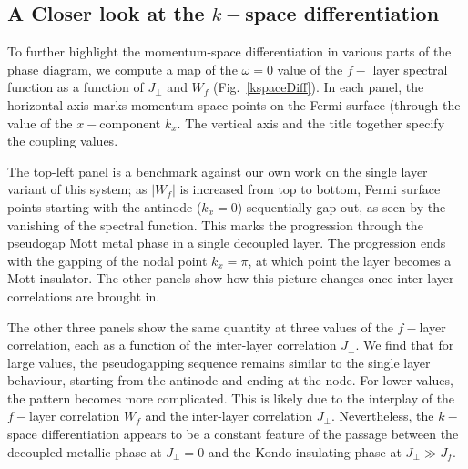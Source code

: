 \documentclass[%
reprint,
superscriptaddress,
groupedaddress,
superscriptaddress,
onecolumn,
10pt
]{revtex4-2}
\begin{document}
\subsection{A Closer look at the \(k-\)space differentiation}
To further highlight the momentum-space differentiation in various parts of the phase diagram, we compute a map of the \(\omega=0\) value of the \(f-\) layer spectral function as a function of \(J_\perp\) and \(W_f\) (Fig.~\ref{kspaceDiff}). In each panel, the horizontal axis marks momentum-space points on the Fermi surface (through the value of the \(x-\)component \(k_x\). The vertical axis and the title together specify the coupling values. 

The top-left panel is a benchmark against our own work on the single layer variant of this system; as \(|W_f|\) is increased from top to bottom, Fermi surface points starting with the antinode (\(k_x=0\)) sequentially gap out, as seen by the vanishing of the spectral function. This marks the progression through the pseudogap Mott metal phase in a single decoupled layer. The progression ends with the gapping of the nodal point \(k_x=\pi\), at which point the layer becomes a Mott insulator. The other panels show how this picture changes once inter-layer correlations are brought in.

The other three panels show the same quantity at three values of the \(f-\)layer correlation, each as a function of the inter-layer correlation \(J_\perp\). We find that for large values, the pseudogapping sequence remains similar to the single layer behaviour, starting from the antinode and ending at the node. For lower values, the pattern becomes more complicated. This is likely due to the interplay of the \(f-\)layer correlation \(W_f\) and the inter-layer correlation \(J_\perp\). Nevertheless, the \(k-\)space differentiation appears to be a constant feature of the passage between the decoupled metallic phase at \(J_\perp = 0\) and the Kondo insulating phase at \(J_\perp \gg J_f\).
\end{document}
